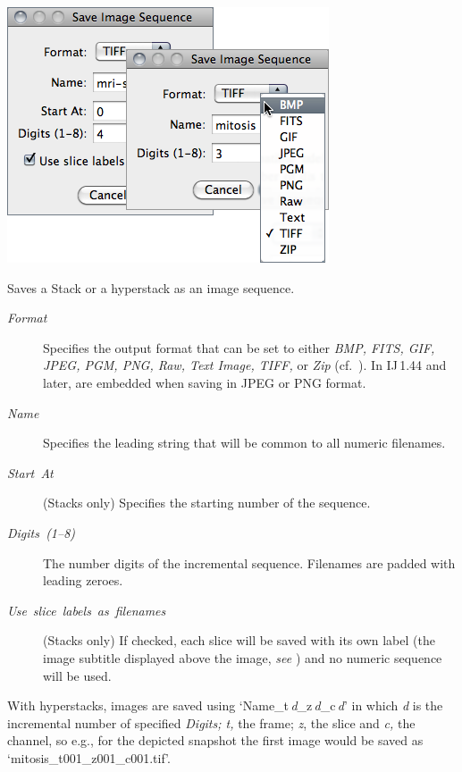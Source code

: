 \begin{minipage}[c][1\totalheight][t]{0.495\columnwidth}%
\includegraphics[scale=0.55]{images/SaveAsImageSequence}%
\end{minipage}%
\begin{minipage}[c][1\totalheight][t]{0.505\columnwidth}%
Saves a Stack or a hyperstack as an image
sequence. 
\begin{description}
\item [{\emph{Format}}] Specifies the output format\emph{ }that can be
set to either\emph{ BMP, FITS, GIF, JPEG, PGM, PNG, Raw, Text Image,
TIFF, }or\emph{ Zip }(cf.\ ). In IJ\,1.44
and later,  are embedded when saving in
JPEG or PNG format.
\item [{\emph{Name}}] Specifies the leading string that will be common
to all numeric filenames.\end{description}
%
\end{minipage}
\begin{description}
\item [{\emph{Start\ At}}] (Stacks only) Specifies the starting number
of the sequence.
\item [{\emph{Digits\ (1--8)}}] The number digits of the incremental sequence.
Filenames are padded with leading zeroes.
\item [{\emph{Use}\ \emph{slice}\ \emph{labels}\ \emph{as}\ \emph{filenames}}] (Stacks
only) If checked, each slice will be saved with its own label (the
image subtitle displayed above the image, \emph{see} )
and no numeric sequence will be used.
\end{description}
With hyperstacks, images are saved using `Name\_t\,\emph{d}\_z\,\emph{d}\_c\,\emph{d}$ $'
in which \emph{d} is the incremental number of specified \emph{Digits;
t, }the frame; \emph{z}, the slice and \emph{c,} the channel, so e.g.,
for the depicted snapshot the first image would be saved as `mitosis\_t001\_z001\_c001.tif'.


